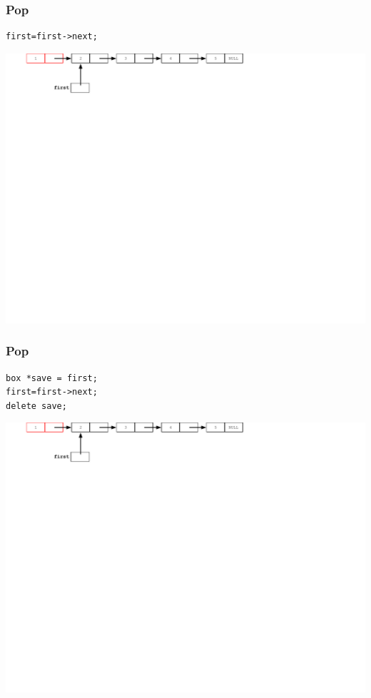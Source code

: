 \documentclass{beamer}
\begin{document}
\begin{frame}[fragile]
\frametitle{Pop}

\begin{flushleft}
\begin{lstlisting}
first=first->next;
\end{lstlisting}  
\end{flushleft}


\includegraphics[width=14.0cm]{images/06_ll_pop}

\end{frame}


\begin{frame}[fragile]
\frametitle{Pop}

\begin{flushleft}
\begin{lstlisting}
box *save = first;
first=first->next;
delete save;
\end{lstlisting}  
\end{flushleft}


\includegraphics[width=14.0cm]{images/06_ll_pop}

\end{frame}
\end{document}
